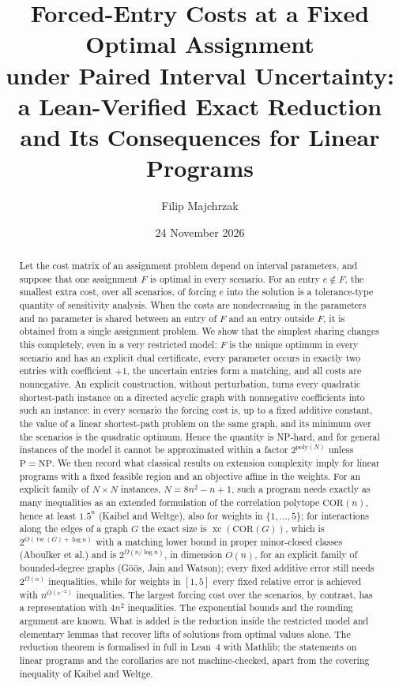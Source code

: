 \documentclass[11pt]{amsart}
\title[Forced-entry costs under paired interval uncertainty]{Forced-Entry Costs at a Fixed Optimal Assignment\\ under Paired Interval Uncertainty:\\ a Lean-Verified Exact Reduction\\ and Its Consequences for Linear Programs}
\author{Filip Majchrzak}
\date{24 November 2026}
\theoremstyle{plain}
\theoremstyle{definition}
\theoremstyle{remark}
\newcommand{\COR}{\mathrm{COR}}
\newcommand{\xc}{\operatorname{xc}}
\begin{document}
\begin{abstract}
Let the cost matrix of an assignment problem depend on interval parameters, and suppose that one assignment $F$ is
optimal in every scenario. For an entry $e\notin F$, the smallest extra cost, over all scenarios, of forcing $e$
into the solution is a tolerance-type quantity of sensitivity analysis. When the costs are nondecreasing in the parameters and no parameter is shared between
an entry of $F$ and an entry outside $F$, it is obtained from a single assignment problem. We show that the simplest sharing changes this completely,
even in a very restricted model: $F$ is the unique optimum in every scenario and has an explicit dual certificate,
every parameter occurs in exactly two entries with coefficient $+1$, the uncertain entries form a matching, and all
costs are nonnegative. An explicit construction, without perturbation, turns every quadratic shortest-path instance on a directed
acyclic graph with nonnegative coefficients into such an instance: in every scenario the forcing cost is, up to a
fixed additive constant, the value of a linear shortest-path problem on the same graph, and its minimum over the
scenarios is the quadratic optimum. Hence the quantity is NP-hard, and for general instances of the model it cannot
be approximated within a factor $2^{\mathrm{poly}(N)}$ unless $\mathrm{P}=\mathrm{NP}$. We then record what classical results on extension complexity
imply for linear programs with a fixed feasible region and an objective affine in the weights. For an explicit
family of $N\times N$ instances, $N=8n^2-n+1$, such a program needs exactly as many inequalities as an extended
formulation of the correlation polytope $\COR(n)$, hence at least $1.5^n$ (Kaibel and Weltge), also for weights in
$\{1,\dots,5\}$; for interactions along the edges of a graph $G$ the exact size is $\xc(\COR(G))$, which is
$2^{O(\operatorname{tw}(G)+\log n)}$ with a matching lower bound in proper minor-closed classes (Aboulker et al.) and
is $2^{\Omega(n/\log n)}$, in dimension $O(n)$, for an explicit family of bounded-degree graphs (G\"o\"os, Jain and
Watson); every fixed additive error still needs $2^{\Omega(n)}$ inequalities, while for weights in $[1,5]$ every fixed
relative error is achieved with $n^{O(\varepsilon^{-2})}$ inequalities. The largest forcing cost over the scenarios,
by contrast, has a representation with $4n^2$ inequalities. The exponential bounds and the rounding
argument are known. What is added is the reduction inside the restricted model and elementary lemmas that recover
lifts of solutions from optimal values alone.
The reduction theorem is formalised in full in Lean~4 with Mathlib; the statements on linear programs and the corollaries are not machine-checked, apart from the covering inequality of Kaibel and Weltge.
\end{abstract}
\end{document}
